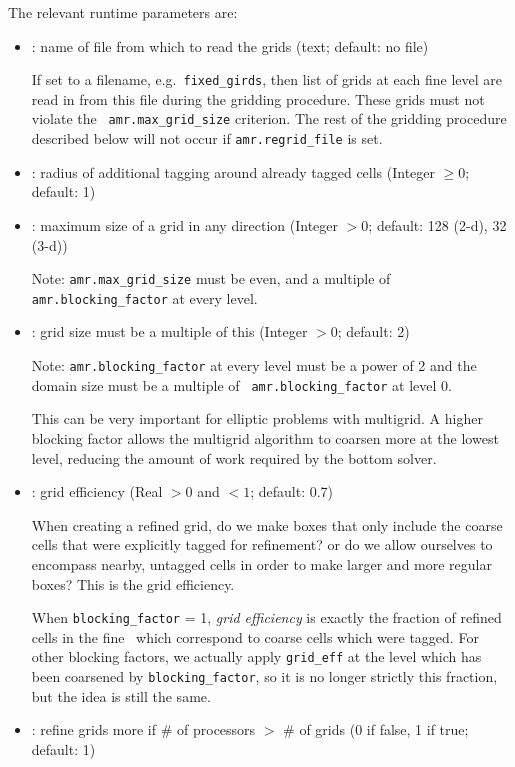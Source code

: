 The relevant runtime parameters are:
\begin{itemize}
\item {}: name of file from which to read the
  grids (text; default: no file)

  If set to a filename, e.g.\ {\tt fixed\_girds}, then list of grids
  at each fine level are read in from this file during the gridding
  procedure. These grids must not violate the {\tt
  amr.max\_grid\_size} criterion.  The rest of the gridding procedure
  described below will not occur if {\tt amr.regrid\_file} is set.

\item {}: radius of additional tagging
  around already tagged cells (Integer $\geq 0$; default: 1)

\item {}: maximum size of a grid in any
  direction (Integer $> 0$; default: 128 (2-d), 32 (3-d))

   Note: {\tt amr.max\_grid\_size} must be even, and a multiple of
   {\tt amr.blocking\_factor} at every level.
   
\item {}: grid size must be a multiple of this
  (Integer $> 0$; default: 2)

   Note: {\tt amr.blocking\_factor} at every level must be a power of
   2 and the domain size must be a multiple of {\tt
     amr.blocking\_factor} at level 0.
   
   This can be very important for elliptic problems with
   multigrid.  A higher blocking factor allows the
   multigrid algorithm to coarsen more at the lowest level, reducing
   the amount of work required by the bottom solver.

\item {}: grid efficiency (Real $>0$ and $<1$;
  default: 0.7)  

  When creating a refined grid, do we make boxes that only include
  the coarse cells that were explicitly tagged for refinement? or 
  do we allow ourselves to encompass nearby, untagged cells in order
  to make larger and more regular boxes?  This is the grid efficiency.

  When {\tt blocking\_factor} = 1, {\em grid efficiency} is exactly the
  fraction of refined cells in the fine \boxarray\ which correspond to
  coarse cells which were tagged.  For other blocking factors,
  we actually apply {\tt grid\_eff} at the level which has been coarsened
  by {\tt blocking\_factor}, so it is no longer strictly this fraction,
  but the idea is still the same.

\item {}: refine grids more if \# of
  processors $>$ \# of grids (0 if false, 1 if true; default: 1) \\
\end{itemize}

